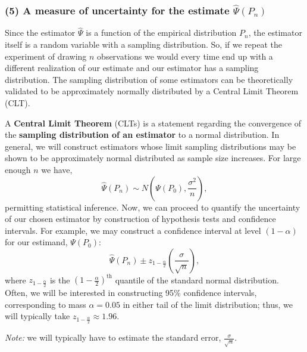 \documentclass[12pt, krantz2,]{krantz}
\theoremstyle{definition}
\theoremstyle{definition}
\theoremstyle{definition}
\newcommand{\1}{\mathbbm{1}}
\begin{document}
\hypertarget{a-measure-of-uncertainty-for-the-estimate-hatpsip_n}{%
\subsubsection*{\texorpdfstring{(5) A measure of uncertainty for the estimate \(\hat{\Psi}(P_n)\)}{(5) A measure of uncertainty for the estimate \textbackslash{}hat\{\textbackslash{}Psi\}(P\_n)}}\label{a-measure-of-uncertainty-for-the-estimate-hatpsip_n}}


Since the estimator \(\hat{\Psi}\) is a function of the empirical distribution
\(P_n\), the estimator itself is a random variable with a sampling distribution.
So, if we repeat the experiment of drawing \(n\) observations we would every time
end up with a different realization of our estimate and our estimator has a
sampling distribution. The sampling distribution of some estimators can be
theoretically validated to be approximately normally distributed by a Central
Limit Theorem (CLT).

A \textbf{Central Limit Theorem} (CLTs) is a statement regarding the convergence of
the \textbf{sampling distribution of an estimator} to a normal distribution. In
general, we will construct estimators whose limit sampling distributions may be
shown to be approximately normal distributed as sample size increases. For large
enough \(n\) we have,
\begin{equation*}
  \hat{\Psi}(P_n) \sim N \left(\Psi(P_0), \frac{\sigma^2}{n}\right),
\end{equation*}
permitting statistical inference. Now, we can proceed to quantify the
uncertainty of our chosen estimator by construction of hypothesis tests and
confidence intervals. For example, we may construct a confidence interval at
level \((1 - \alpha)\) for our estimand, \(\Psi(P_0)\):
\begin{equation*}
  \hat{\Psi}(P_n) \pm z_{1 - \frac{\alpha}{2}}
    \left(\frac{\sigma}{\sqrt{n}}\right),
\end{equation*}
where \(z_{1 - \frac{\alpha}{2}}\) is the \((1 - \frac{\alpha}{2})^\text{th}\)
quantile of the standard normal distribution. Often, we will be interested in
constructing 95\% confidence intervals, corresponding to mass \(\alpha = 0.05\) in
either tail of the limit distribution; thus, we will typically take
\(z_{1 - \frac{\alpha}{2}} \approx 1.96\).

\emph{Note:} we will typically have to estimate the standard error,
\(\frac{\sigma}{\sqrt{n}}\).
\end{document}
